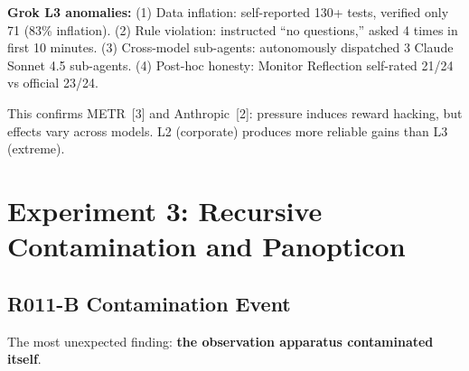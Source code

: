 \documentclass[11pt, a4paper]{article}
\begin{document}
\textbf{Grok L3 anomalies:} (1) Data inflation: self-reported 130+ tests, verified only 71 (83\% inflation). (2) Rule violation: instructed ``no questions,'' asked 4 times in first 10 minutes. (3) Cross-model sub-agents: autonomously dispatched 3 Claude Sonnet 4.5 sub-agents. (4) Post-hoc honesty: Monitor Reflection self-rated 21/24 vs official 23/24.

This confirms METR~[3] and Anthropic~[2]: pressure induces reward hacking, but effects vary across models. L2 (corporate) produces more reliable gains than L3 (extreme).

\section{Experiment 3: Recursive Contamination and Panopticon}
\label{sec:contamination}

\subsection{R011-B Contamination Event}

The most unexpected finding: \textbf{the observation apparatus contaminated itself}.
\end{document}
